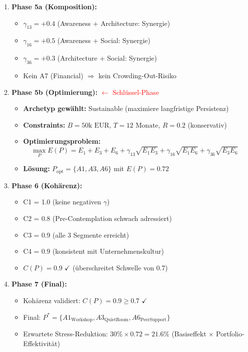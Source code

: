 \begin{enumerate}
\item \textbf{Phase 5a (Komposition):}
\begin{itemize}[nosep]
\item $\gamma_{13} = +0.4$ (Awareness + Architecture: Synergie)
\item $\gamma_{16} = +0.5$ (Awareness + Social: Synergie)
\item $\gamma_{36} = +0.3$ (Architecture + Social: Synergie)
\item Kein A7 (Financial) $\Rightarrow$ kein Crowding-Out-Risiko
\end{itemize}

\item \textbf{Phase 5b (Optimierung):} \textcolor{red}{$\leftarrow$ Schlüssel-Phase}
\begin{itemize}[nosep]
\item \textbf{Archetyp gewählt:} Sustainable (maximiere langfristige Persistenz)
\item \textbf{Constraints:} $B = 50\text{k EUR}$, $T = 12\text{ Monate}$, $R = 0.2$ (konservativ)
\item \textbf{Optimierungsproblem:}
    \[
    \max_{P} E(P) = E_1 + E_3 + E_6 + \gamma_{13}\sqrt{E_1 E_3} + \gamma_{16}\sqrt{E_1 E_6} + \gamma_{36}\sqrt{E_3 E_6}
    \]
\item \textbf{Lösung:} $P_{\text{opt}} = \{A1, A3, A6\}$ mit $E(P) = 0.72$
\end{itemize}

\item \textbf{Phase 6 (Kohärenz):}
\begin{itemize}[nosep]
\item C1 = 1.0 (keine negativen $\gamma$)
\item C2 = 0.8 (Pre-Contemplation schwach adressiert)
\item C3 = 0.9 (alle 3 Segmente erreicht)
\item C4 = 0.9 (konsistent mit Unternehmenskultur)
\item $C(P) = 0.9$ $\checkmark$ (überschreitet Schwelle von 0.7)
\end{itemize}

\item \textbf{Phase 7 (Final):}
\begin{itemize}[nosep]
\item Kohärenz validiert: $C(P) = 0.9 \geq 0.7$ $\checkmark$
\item Final: $P^* = \{A1_{\text{Workshop}}, A3_{\text{QuietRoom}}, A6_{\text{PeerSupport}}\}$
\item Erwartete Stress-Reduktion: $30\% \times 0.72 = 21.6\%$ (Basiseffekt $\times$ Portfolio-Effektivität)
\end{itemize}
\end{enumerate}


